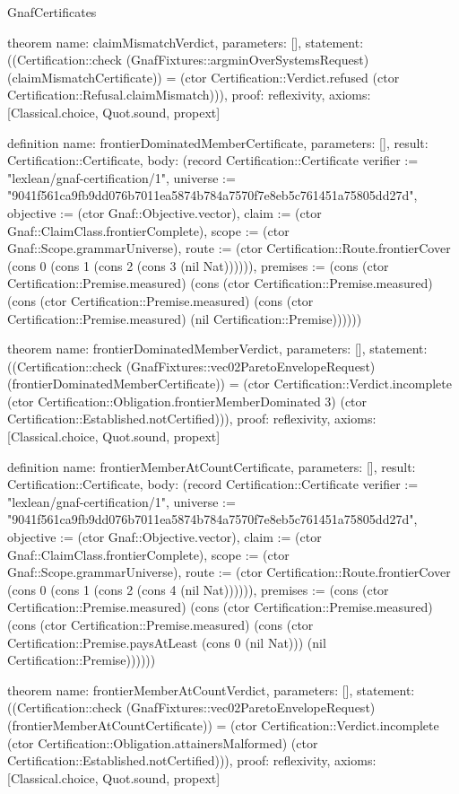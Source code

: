 \begin{lexlean}{GnafCertificates}
\begin{semanticmodule}
theorem{
  name: claimMismatchVerdict,
  parameters: [],
  statement: ((Certification::check (GnafFixtures::argminOverSystemsRequest) (claimMismatchCertificate)) = (ctor Certification::Verdict.refused (ctor Certification::Refusal.claimMismatch))),
  proof: reflexivity{},
  axioms: [Classical.choice, Quot.sound, propext]
}

definition{
  name: frontierDominatedMemberCertificate,
  parameters: [],
  result: Certification::Certificate,
  body: (record Certification::Certificate {verifier := "lexlean/gnaf-certification/1", universe := "9041f561ca9fb9dd076b7011ea5874b784a7570f7e8eb5c761451a75805dd27d", objective := (ctor Gnaf::Objective.vector), claim := (ctor Gnaf::ClaimClass.frontierComplete), scope := (ctor Gnaf::Scope.grammarUniverse), route := (ctor Certification::Route.frontierCover (cons 0 (cons 1 (cons 2 (cons 3 (nil Nat)))))), premises := (cons (ctor Certification::Premise.measured) (cons (ctor Certification::Premise.measured) (cons (ctor Certification::Premise.measured) (cons (ctor Certification::Premise.measured) (nil Certification::Premise)))))})
}

theorem{
  name: frontierDominatedMemberVerdict,
  parameters: [],
  statement: ((Certification::check (GnafFixtures::vec02ParetoEnvelopeRequest) (frontierDominatedMemberCertificate)) = (ctor Certification::Verdict.incomplete (ctor Certification::Obligation.frontierMemberDominated 3) (ctor Certification::Established.notCertified))),
  proof: reflexivity{},
  axioms: [Classical.choice, Quot.sound, propext]
}

definition{
  name: frontierMemberAtCountCertificate,
  parameters: [],
  result: Certification::Certificate,
  body: (record Certification::Certificate {verifier := "lexlean/gnaf-certification/1", universe := "9041f561ca9fb9dd076b7011ea5874b784a7570f7e8eb5c761451a75805dd27d", objective := (ctor Gnaf::Objective.vector), claim := (ctor Gnaf::ClaimClass.frontierComplete), scope := (ctor Gnaf::Scope.grammarUniverse), route := (ctor Certification::Route.frontierCover (cons 0 (cons 1 (cons 2 (cons 4 (nil Nat)))))), premises := (cons (ctor Certification::Premise.measured) (cons (ctor Certification::Premise.measured) (cons (ctor Certification::Premise.measured) (cons (ctor Certification::Premise.paysAtLeast (cons 0 (nil Nat))) (nil Certification::Premise)))))})
}

theorem{
  name: frontierMemberAtCountVerdict,
  parameters: [],
  statement: ((Certification::check (GnafFixtures::vec02ParetoEnvelopeRequest) (frontierMemberAtCountCertificate)) = (ctor Certification::Verdict.incomplete (ctor Certification::Obligation.attainersMalformed) (ctor Certification::Established.notCertified))),
  proof: reflexivity{},
  axioms: [Classical.choice, Quot.sound, propext]
}


\end{semanticmodule}
\end{lexlean}
